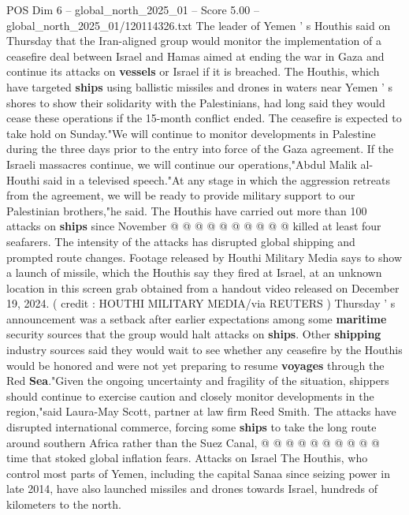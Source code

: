 \begin{textsample}{POS Dim 6 – global\_north\_2025\_01 – Score 5.00 – global\_north\_2025\_01/120114326.txt}  \label{ex:f6_pos_279}
The leader of Yemen ' s Houthis said on Thursday that the Iran-aligned group would monitor the implementation of a ceasefire deal between Israel and Hamas aimed at ending the war in Gaza and continue its attacks on \textbf{vessels} or Israel if it is breached.
The Houthis, which have targeted \textbf{ships} using ballistic missiles and drones in waters near Yemen ' s shores to show their solidarity with the Palestinians, had long said they would cease these operations if the 15-month conflict ended.
The ceasefire is expected to take hold on Sunday."We will continue to monitor developments in Palestine during the three days prior to the entry into force of the Gaza agreement.
If the Israeli massacres continue, we will continue our operations,"Abdul Malik al-Houthi said in a televised speech."At any stage in which the aggression retreats from the agreement, we will be ready to provide military support to our Palestinian brothers,"he said.
The Houthis have carried out more than 100 attacks on \textbf{ships} since November @ @ @ @ @ @ @ @ @ @ killed at least four seafarers.
The intensity of the attacks has disrupted global shipping and prompted route changes.
Footage released by Houthi Military Media says to show a launch of missile, which the Houthis say they fired at Israel, at an unknown location in this screen grab obtained from a handout video released on December 19, 2024. ( credit : HOUTHI MILITARY MEDIA/via REUTERS ) Thursday ' s announcement was a setback after earlier expectations among some \textbf{maritime} security sources that the group would halt attacks on \textbf{ships}.
Other \textbf{shipping} industry sources said they would wait to see whether any ceasefire by the Houthis would be honored and were not yet preparing to resume \textbf{voyages} through the Red \textbf{Sea}."Given the ongoing uncertainty and fragility of the situation, shippers should continue to exercise caution and closely monitor developments in the region,"said Laura-May Scott, partner at law firm Reed Smith.
The attacks have disrupted international commerce, forcing some \textbf{ships} to take the long route around southern Africa rather than the Suez Canal, @ @ @ @ @ @ @ @ @ @ time that stoked global inflation fears.
Attacks on Israel The Houthis, who control most parts of Yemen, including the capital Sanaa since seizing power in late 2014, have also launched missiles and drones towards Israel, hundreds of kilometers to the north.

\end{textsample}
